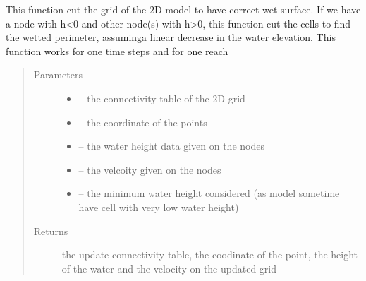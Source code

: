 \documentclass[letterpaper,10pt,english]{sphinxmanual}
\begin{document}
\begin{fulllineitems}
\label{\detokenize{index:src.manage_grid_8.cut_2d_grid}}
This function cut the grid of the 2D model to have correct wet surface. If we have a node with h\textless{}0 and other node(s)
with h\textgreater{}0, this function cut the cells to find the wetted perimeter, assuminga linear decrease in the water elevation.
This function works for one time steps and for one reach
\begin{quote}\begin{description}
\item[{Parameters}] \leavevmode\begin{itemize}
\item {} 
 -- the connectivity table of the 2D grid

\item {} 
 -- the coordinate of the points

\item {} 
 -- the water height data given on the nodes

\item {} 
 -- the velcoity given on the nodes

\item {} 
 -- the minimum water height considered (as model sometime have cell with very low water height)

\end{itemize}

\item[{Returns}] \leavevmode
the update connectivity table, the coodinate of the point, the height of the water and the velocity on the updated grid

\end{description}\end{quote}

\end{fulllineitems}

\end{document}
